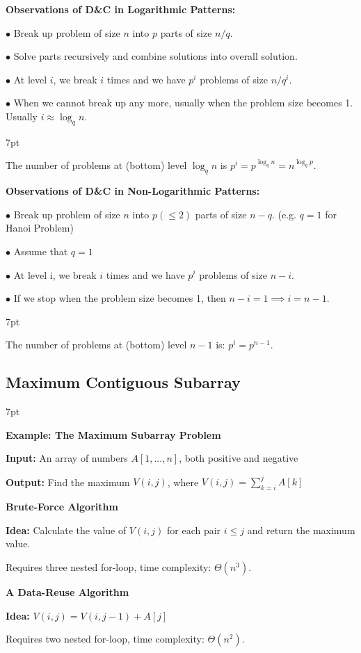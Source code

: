 \documentclass[10pt]{article}
\newenvironment{formal}[2]{%
	\def\FrameCommand{%
		\hspace{1pt}%
		{\color{#1}\vrule width 2pt}%
		{\color{#2}\vrule width 4pt}%
		\colorbox{#2}%
	}%
	\MakeFramed{\advance\hsize-\width\FrameRestore}%
	\noindent\hspace{-4.55pt}%
	\begin{adjustwidth}{}{7pt}%
		\vspace{2pt}\vspace{2pt}%
	}
	{%
		\vspace{2pt}\end{adjustwidth}\endMakeFramed%
}
\begin{document}
\textbf{Observations of D\&C in Logarithmic Patterns:}

$\bullet$ Break up problem of size $n$ into $p$ parts of size $n/q$.

$\bullet$ Solve parts recursively and combine solutions into overall solution.

$\bullet$ At level $i$, we break $i$ times and we have $p^i$ problems of size $n/q^i$.

$\bullet$ When we cannot break up any more, usually when the problem size 
becomes 1. Usually $i \approx \log_q n$.

\begin{formal}{DarkGreen}{greenshade}

The number of problems at (bottom) level $\log_q n$ is $p^i = p^{\log_q n} = n^{\log_q p}$.

\end{formal}

\vspace{1em}

\textbf{Observations of D\&C in Non-Logarithmic Patterns:}

$\bullet$ Break up problem of size $n$ into $p(\leq 2)$ parts of size $n-q$. (e.g. $q=1$ for Hanoi Problem)

$\bullet$ Assume that $q=1$

$\bullet$ At level i, we break $i$ times and we have $p^i$ problems of size $n-i$.

$\bullet$ If we stop when the problem size becomes 1, then $n-i=1 \implies i=n-1$.

\begin{formal}{DarkGreen}{greenshade}

The number of problems at (bottom) level $n-1$ is: $p^i = p^{n-1}$.

\end{formal}

\subsection{Maximum Contiguous Subarray}

\begin{formal}{Brown}{brownshade}
	
	\textbf{Example: The Maximum Subarray Problem}
	
	\textbf{Input:} An array of numbers $A[1,...,n]$, both positive and negative
	
	\textbf{Output:} Find the maximum $V(i, j)$, where $V(i, j) = \sum_{k=i}^j A[k]$
	
\noindent \textbf{Brute-Force Algorithm}

\textbf{Idea:} Calculate the value of $V(i, j)$ for each pair $i\leq j$ and return the maximum value.

Requires three nested for-loop, time complexity: $\Theta(n^3)$.

\noindent \textbf{A Data-Reuse Algorithm}

\textbf{Idea:} $V(i, j) = V(i, j-1) + A[j]$

Requires two nested for-loop, time complexity: $\Theta(n^2)$.

\end{formal}
\end{document}
